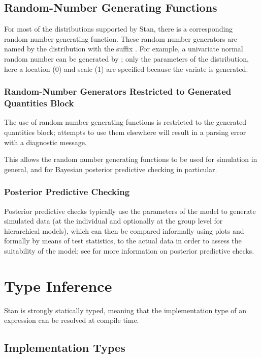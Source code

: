 \subsection{Random-Number Generating Functions}

For most of the distributions supported by Stan, there is a
corresponding random-number generating function.  These random number
generators are named by the distribution with the suffix .
For example, a univariate normal random number can be generated by
;  only the parameters of the distribution,
here a location (0) and scale (1) are specified because the variate is
generated.  

\subsubsection{Random-Number Generators Restricted to Generated Quantities Block}

The use of random-number generating functions is restricted to the
generated quantities block; attempts to use them elsewhere will result
in a parsing error with a diagnostic message.  

This allows the random number generating functions to be used for
simulation in general, and for Bayesian posterior predictive checking
in particular. 

\subsubsection{Posterior Predictive Checking}

Posterior predictive checks typically use the parameters of the model
to generate simulated data (at the individual and optionally at the
group level for hierarchical models), which can then be compared
informally using plots and formally by means of test statistics, to
the actual data in order to assess the suitability of the model; see
\citep[Chapter~6]{GelmanCarlinSternRubin:2003} for more information on
posterior predictive checks.

\section{Type Inference}

Stan is strongly statically typed, meaning that the implementation
type of an expression can be resolved at compile time.

\subsection{Implementation Types}

